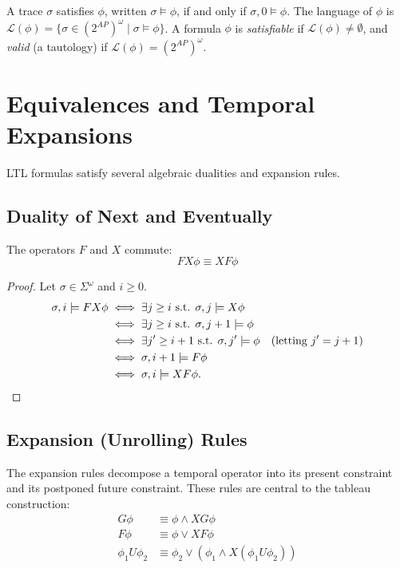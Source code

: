 A trace $\sigma$ satisfies $\phi$, written $\sigma \models \phi$, if and only if $\sigma, 0 \models \phi$. The language of $\phi$ is $\mathcal{L}(\phi) = \{ \sigma \in (2^{AP})^\omega \mid \sigma \models \phi \}$. 
A formula $\phi$ is \emph{satisfiable} if $\mathcal{L}(\phi) \neq \emptyset$, and \emph{valid} (a tautology) if $\mathcal{L}(\phi) = (2^{AP})^\omega$.

\section{Equivalences and Temporal Expansions}
\label{sec:ltl-equivalences}

LTL formulas satisfy several algebraic dualities and expansion rules.

\subsection{Duality of Next and Eventually}
The operators $F$ and $X$ commute:
\[
  F X \phi \equiv X F \phi
\]
\begin{proof}
Let $\sigma \in \Sigma^\omega$ and $i \ge 0$.
\begin{align*}
  \sigma, i \models F X \phi &\iff \exists j \ge i \text{ s.t. } \sigma, j \models X \phi \\
  &\iff \exists j \ge i \text{ s.t. } \sigma, j+1 \models \phi \\
  &\iff \exists j' \ge i+1 \text{ s.t. } \sigma, j' \models \phi \quad (\text{letting } j' = j+1) \\
  &\iff \sigma, i+1 \models F \phi \\
  &\iff \sigma, i \models X F \phi. \qedhere
\end{align*}
\end{proof}

\subsection{Expansion (Unrolling) Rules}
The expansion rules decompose a temporal operator into its present constraint and its postponed future constraint. These rules are central to the tableau construction:
\begin{align*}
  G \phi &\equiv \phi \land X G \phi \\
  F \phi &\equiv \phi \lor X F \phi \\
  \phi_1 U \phi_2 &\equiv \phi_2 \lor (\phi_1 \land X (\phi_1 U \phi_2))
\end{align*}

